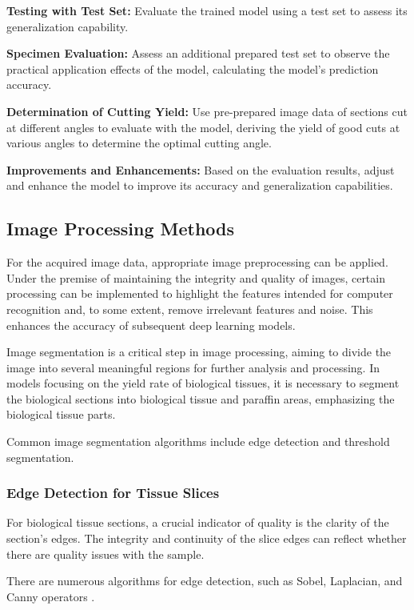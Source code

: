 \textbf{Testing with Test Set:} Evaluate the trained model using a test set to assess its generalization capability.

\textbf{Specimen Evaluation:} Assess an additional prepared test set to observe the practical application effects of the model, calculating the model’s prediction accuracy.

\textbf{Determination of Cutting Yield:} Use pre-prepared image data of sections cut at different angles to evaluate with the model, deriving the yield of good cuts at various angles to determine the optimal cutting angle.

\textbf{Improvements and Enhancements:} Based on the evaluation results, adjust and enhance the model to improve its accuracy and generalization capabilities.

\subsection{Image Processing Methods}

For the acquired image data, appropriate image preprocessing can be applied. Under the premise of maintaining the integrity and quality of images, certain processing can be implemented to highlight the features intended for computer recognition and, to some extent, remove irrelevant features and noise. This enhances the accuracy of subsequent deep learning models.

Image segmentation is a critical step in image processing, aiming to divide the image into several meaningful regions for further analysis and processing. In models focusing on the yield rate of biological tissues, it is necessary to segment the biological sections into biological tissue and paraffin areas, emphasizing the biological tissue parts.

Common image segmentation algorithms include edge detection and threshold segmentation.

\subsubsection{Edge Detection for Tissue Slices}
For biological tissue sections, a crucial indicator of quality is the clarity of the section's edges. The integrity and continuity of the slice edges can reflect whether there are quality issues with the sample.

There are numerous algorithms for edge detection, such as Sobel, Laplacian, and Canny operators \cite{3.1}.

